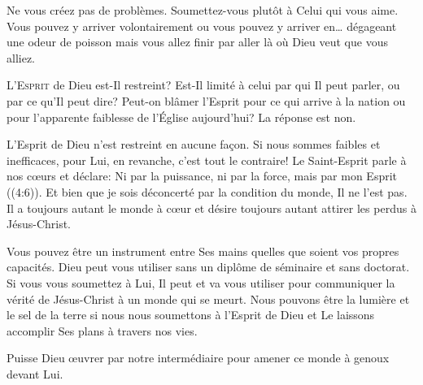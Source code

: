 Ne vous créez pas de problèmes. Soumettez-vous
 plutôt à Celui qui vous aime.
 Vous pouvez y arriver volontairement ou vous pouvez y arriver en\dots{}
 dégageant une odeur de poisson \ocadr mais vous allez finir par aller
 là où Dieu veut que vous alliez. 

\dvrule







\lettrine{L}{'Esprit} de Dieu est-Il restreint?
 Est-Il limité à celui par qui Il peut parler, ou par ce qu'Il peut dire?
 Peut-on blâmer l'Esprit pour ce qui arrive à la nation
 ou pour l'apparente faiblesse de l'Église aujourd'hui? La réponse est non. 


L'Esprit de Dieu n'est restreint en aucune fa\c{c}on.
 Si nous sommes faibles et inefficaces, pour Lui, en revanche,
 c'est tout le contraire!
 Le Saint-Esprit parle à nos c\oe{}urs et déclare: 
 \Og Ni par la puissance, ni par la force, mais par mon Esprit \Fg{}
 ((4:6)).
 Et bien que je sois déconcerté par la condition du monde, Il ne l'est pas.
 Il a toujours autant le monde à c\oe{}ur et désire toujours autant attirer
 les perdus à Jésus-Christ. 

Vous pouvez être un instrument entre Ses mains quelles que soient
 vos propres capacités. Dieu peut vous utiliser sans un diplôme
 de séminaire et sans doctorat. Si vous vous soumettez à Lui,
 Il peut et va vous utiliser pour communiquer la vérité de Jésus-Christ
 à un monde qui se meurt. Nous pouvons être la lumière
 et le sel de la terre si nous nous soumettons à l'Esprit de Dieu
 et Le laissons accomplir Ses plans à travers nos vies. 

Puisse Dieu \oe{}uvrer par notre intermédiaire pour amener ce monde à genoux devant Lui.

